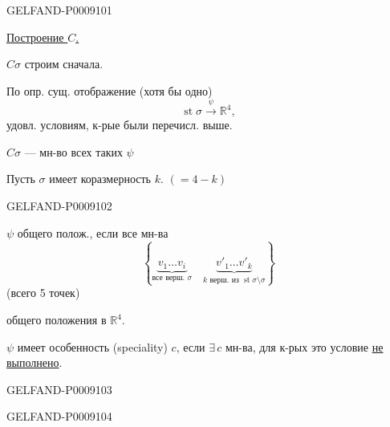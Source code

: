 \begin{GelfandAdjacentEvidence}{GELFAND-P000910}{1}

\uline{Построение \(C\).}

$C\sigma$ строим сначала.

По опр. сущ. отображение (хотя бы одно)
\begin{equation*}
\operatorname{st}\sigma\overset{\psi}{\longrightarrow}\mathbb R^4,
\tag{7}
\end{equation*}
удовл. условиям, к-рые были перечисл. выше.

$C\sigma$ --- мн-во всех таких $\psi$

Пусть $\sigma$ имеет коразмерность $k$. $(=4-k)$
\end{GelfandAdjacentEvidence}
\begin{GelfandAdjacentEvidence}{GELFAND-P000910}{2}


$\psi$ общего полож., если все мн-ва
\begin{equation*}
\left\{
\underbrace{v_1\ldots v_i}_{\text{все верш. }\sigma}
\quad
\underbrace{v'_1\ldots v'_k}_{k\text{ верш. из }\operatorname{st}\sigma\setminus\sigma}
\right\}
\tag{8}
\end{equation*}
(всего 5 точек)

общего положения в $\mathbb R^4$.

$\psi$ имеет особенность (speciality) $c$, если $\exists\,c$ мн-ва, для к-рых это условие \uline{не выполнено}.
\end{GelfandAdjacentEvidence}
\begin{GelfandAdjacentEvidence}{GELFAND-P000910}{3}

\end{GelfandAdjacentEvidence}
\begin{GelfandAdjacentEvidence}{GELFAND-P000910}{4}

\end{GelfandAdjacentEvidence}
